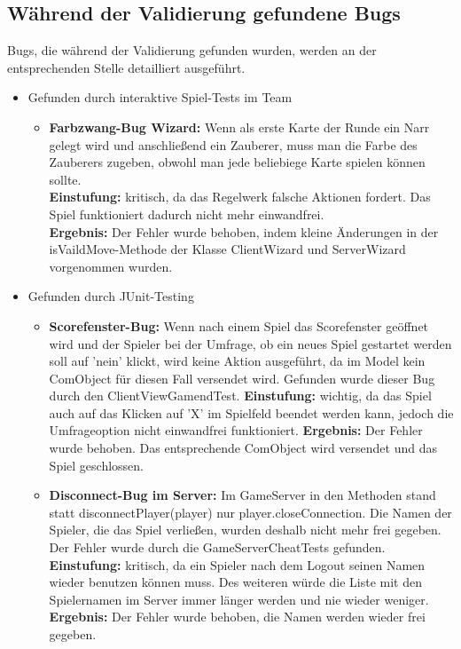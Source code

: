 \documentclass[a4paper]{article}
\begin{document}
\subsection{Während der Validierung gefundene Bugs}
	Bugs, die während der Validierung gefunden wurden, werden an der entsprechenden Stelle detailliert ausgeführt.
	\begin{itemize}
	\item Gefunden durch interaktive Spiel-Tests im Team
	\begin{itemize}
	\item{\textbf{Farbzwang-Bug Wizard:}} Wenn als erste Karte der Runde ein Narr gelegt wird und anschließend ein Zauberer, muss man die Farbe des Zauberers zugeben, obwohl man jede beliebiege Karte spielen können sollte.\\
	\textbf{Einstufung:} kritisch, da das Regelwerk falsche Aktionen fordert. Das Spiel funktioniert dadurch nicht mehr einwandfrei.\\
	\textbf{Ergebnis:} Der Fehler wurde behoben, indem kleine Änderungen in der isVaildMove-Methode der Klasse ClientWizard und ServerWizard vorgenommen wurden.
	\end{itemize}
	\item Gefunden durch JUnit-Testing
	\begin{itemize}
	\item{\textbf{Scorefenster-Bug:}} Wenn nach einem Spiel das Scorefenster geöffnet wird und der Spieler bei der Umfrage, ob ein neues Spiel gestartet werden soll auf 'nein' klickt, wird keine Aktion ausgeführt, da im Model kein ComObject für diesen Fall versendet wird. Gefunden wurde dieser Bug durch den ClientViewGamendTest.
	\textbf{Einstufung:} wichtig, da das Spiel auch auf das Klicken auf 'X' im Spielfeld beendet werden kann, jedoch die Umfrageoption nicht einwandfrei funktioniert.
	\textbf{Ergebnis:} Der Fehler wurde behoben. Das entsprechende ComObject wird versendet und das Spiel geschlossen. 
	
	\item{\textbf{Disconnect-Bug im Server:}} Im GameServer in den Methoden stand statt disconnectPlayer(player) nur player.closeConnection. Die Namen der Spieler, die das Spiel verließen, wurden deshalb nicht mehr frei gegeben.
Der Fehler wurde durch die GameServerCheatTests gefunden.\\
	\textbf{Einstufung:} kritisch, da ein Spieler nach dem Logout seinen Namen wieder benutzen können muss. Des weiteren würde die Liste mit den Spielernamen im Server immer länger werden und nie wieder weniger.\\
	\textbf{Ergebnis:} Der Fehler wurde behoben, die Namen werden wieder frei gegeben.
	\end{itemize}
\end{itemize}
 
\end{document}
